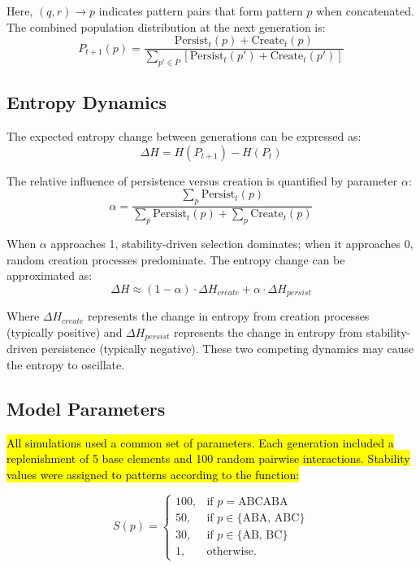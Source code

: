 \documentclass[preprint,12pt]{elsarticle}
\newcommand{\added}[1]{\hl{#1}}
\begin{document}
Here, \((q,r) \to p\) indicates pattern pairs that form pattern \(p\) when concatenated. The combined population distribution at the next generation is:
\begin{equation}
\label{eq:full-ba-update}
P_{t+1}(p) = \frac{
  \mathrm{Persist}_t(p) + \mathrm{Create}_t(p)
}{
  \sum_{p' \in P} 
  \left[
    \mathrm{Persist}_t(p') + \mathrm{Create}_t(p')
  \right]
}
\end{equation}

\subsection{Entropy Dynamics}

The expected entropy change between generations can be expressed as:
\begin{equation}
\Delta H = H(P_{t+1}) - H(P_t)
\end{equation}

The relative influence of persistence versus creation is quantified by parameter $\alpha$:
\begin{equation}
\alpha = \frac{\sum_p \mathrm{Persist}_t(p)}{\sum_p \mathrm{Persist}_t(p) + \sum_p \mathrm{Create}_t(p)}
\end{equation}

When $\alpha$ approaches 1, stability-driven selection dominates; when it approaches 0, random creation processes predominate. The entropy change can be approximated as:
\begin{equation}
\Delta H \approx (1 - \alpha) \cdot \Delta H_{create} + \alpha \cdot \Delta H_{persist}
\end{equation}

Where $\Delta H_{create}$ represents the change in entropy from creation processes (typically positive) and $\Delta H_{persist}$ represents the change in entropy from stability-driven persistence (typically negative). These two competing dynamics may cause the entropy to oscillate.

\subsection{Model Parameters}

\added{All simulations used a common set of parameters. Each generation included
a replenishment of 5 base elements and 100 random pairwise
interactions. Stability values were assigned to patterns according to the
function:}

\begin{equation}
S(p) =
\begin{cases}
100, & \text{if } p = \text{ABCABA} \\
50, & \text{if } p \in \{\text{ABA, ABC}\} \\
30, & \text{if } p \in \{\text{AB, BC}\} \\
1, & \text{otherwise}.
\end{cases}
\end{equation}
\end{document}
